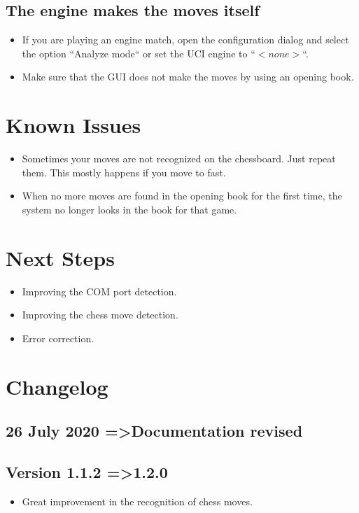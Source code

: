 \documentclass[11pt,a4paper]{article}
\begin{document}
\subsection{The engine makes the moves itself}
\begin{itemize}
\item If you are playing an engine match, open the configuration dialog and select the option ``Analyze mode`` or set the UCI engine to ``\begin{math}<none>\end{math}``.
\item Make sure that the GUI does not make the moves by using an opening book.
\end{itemize}

\section{Known Issues}
\begin{itemize}
    \item Sometimes your moves are not recognized on the chessboard. Just repeat them. This mostly happens if you move to fast.
	\item When no more moves are found in the opening book for the first time, the system no longer looks in the book for that game.
\end{itemize}

\section{Next Steps}
\begin{itemize}
	\item Improving the COM port detection.
	\item Improving the chess move detection.
	\item Error correction.
\end{itemize}

\pagebreak

\section{Changelog}
\subsection{26 July 2020 =\textgreater Documentation revised}
\subsection{Version 1.1.2 =\textgreater 1.2.0}
\begin{itemize}
	\item Great improvement in the recognition of chess moves.
\end{itemize}
\end{document}
